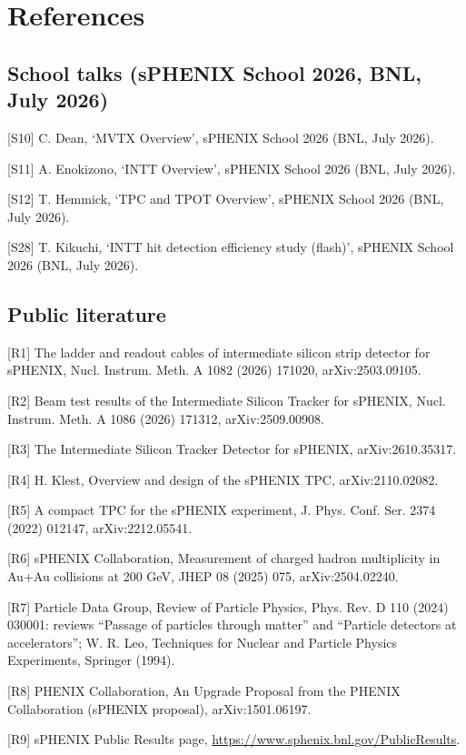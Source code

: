 \documentclass[11pt,letterpaper]{article}
\begin{document}
\section*{References}
\subsection*{School talks (sPHENIX School 2026, BNL, July 2026)}
\begin{description}[itemsep=1pt,font=\normalfont]
\item{[S10]} C. Dean, `MVTX Overview', sPHENIX School 2026 (BNL, July 2026).
\item{[S11]} A. Enokizono, `INTT Overview', sPHENIX School 2026 (BNL, July 2026).
\item{[S12]} T. Hemmick, `TPC and TPOT Overview', sPHENIX School 2026 (BNL, July 2026).
\item{[S28]} T. Kikuchi, `INTT hit detection efficiency study (flash)', sPHENIX School 2026 (BNL, July 2026).
\end{description}
\subsection*{Public literature}
\begin{description}[itemsep=1pt,font=\normalfont]
\item{[R1]} The ladder and readout cables of intermediate silicon strip detector for sPHENIX, Nucl. Instrum. Meth. A 1082 (2026) 171020, arXiv:2503.09105.
\item{[R2]} Beam test results of the Intermediate Silicon Tracker for sPHENIX, Nucl. Instrum. Meth. A 1086 (2026) 171312, arXiv:2509.00908.
\item{[R3]} The Intermediate Silicon Tracker Detector for sPHENIX, arXiv:2610.35317.
\item{[R4]} H. Klest, Overview and design of the sPHENIX TPC, arXiv:2110.02082.
\item{[R5]} A compact TPC for the sPHENIX experiment, J. Phys. Conf. Ser. 2374 (2022) 012147, arXiv:2212.05541.
\item{[R6]} sPHENIX Collaboration, Measurement of charged hadron multiplicity in Au+Au collisions at 200 GeV, JHEP 08 (2025) 075, arXiv:2504.02240.
\item{[R7]} Particle Data Group, Review of Particle Physics, Phys. Rev. D 110 (2024) 030001: reviews ``Passage of particles through matter'' and ``Particle detectors at accelerators''; W. R. Leo, Techniques for Nuclear and Particle Physics Experiments, Springer (1994).
\item{[R8]} PHENIX Collaboration, An Upgrade Proposal from the PHENIX Collaboration (sPHENIX proposal), arXiv:1501.06197.
\item{[R9]} sPHENIX Public Results page, \url{https://www.sphenix.bnl.gov/PublicResults}.
\end{description}
\end{document}
